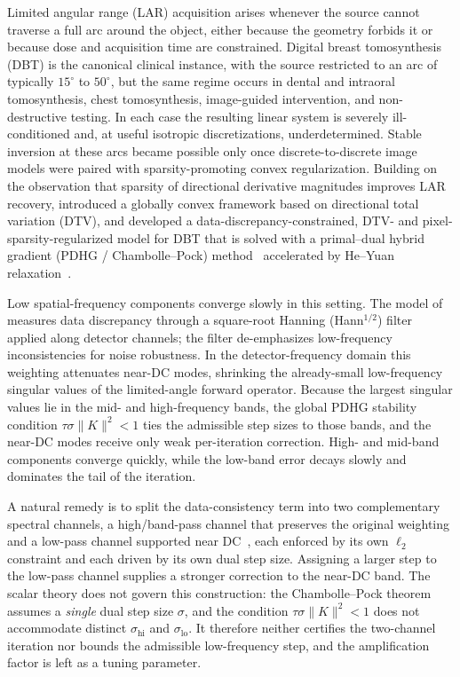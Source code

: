 \documentclass{article}
\begin{document}
Limited angular range (LAR) acquisition arises whenever the source cannot traverse a full arc around the object, either because the geometry forbids it or because dose and acquisition time are constrained. Digital breast tomosynthesis (DBT) is the canonical clinical instance, with the source restricted to an arc of typically $15^\circ$ to $50^\circ$, but the same regime occurs in dental and intraoral tomosynthesis, chest tomosynthesis, image-guided intervention, and non-destructive testing. In each case the resulting linear system is severely ill-conditioned and, at useful isotropic discretizations, underdetermined. Stable inversion at these arcs became possible only once discrete-to-discrete image models were paired with sparsity-promoting convex regularization. Building on the observation that sparsity of directional derivative magnitudes improves LAR recovery, \citet{zhang2021directional} introduced a globally convex framework based on directional total variation (DTV), and \citet{sidky2025accurate} developed a data-discrepancy-constrained, DTV- and pixel-sparsity-regularized model for DBT that is solved with a primal--dual hybrid gradient (PDHG / Chambolle--Pock) method~\citep{chambolle2011first} accelerated by He--Yuan relaxation~\citep{he2012convergence}.

Low spatial-frequency components converge slowly in this setting. The model of \citet{sidky2025accurate} measures data discrepancy through a square-root Hanning (Hann$^{1/2}$) filter applied along detector channels; the filter de-emphasizes low-frequency inconsistencies for noise robustness. In the detector-frequency domain this weighting attenuates near-DC modes, shrinking the already-small low-frequency singular values of the limited-angle forward operator. Because the largest singular values lie in the mid- and high-frequency bands, the global PDHG stability condition $\tau\sigma\|K\|^2<1$ ties the admissible step sizes to those bands, and the near-DC modes receive only weak per-iteration correction. High- and mid-band components converge quickly, while the low-band error decays slowly and dominates the tail of the iteration.

A natural remedy is to split the data-consistency term into two complementary spectral channels, a high/band-pass channel that preserves the original weighting and a low-pass channel supported near DC~\citep{iyadomi2026accelerating}, each enforced by its own $\ell_2$ constraint and each driven by its own dual step size. Assigning a larger step to the low-pass channel supplies a stronger correction to the near-DC band. The scalar theory does not govern this construction: the Chambolle--Pock theorem assumes a \emph{single} dual step size $\sigma$, and the condition $\tau\sigma\|K\|^2<1$ does not accommodate distinct $\sigma_{\mathrm{hi}}$ and $\sigma_{\mathrm{lo}}$. It therefore neither certifies the two-channel iteration nor bounds the admissible low-frequency step, and the amplification factor is left as a tuning parameter.
\end{document}
